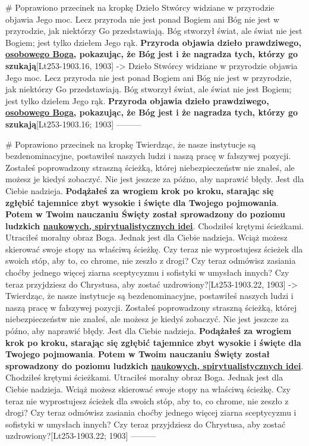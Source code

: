 # Poprawiono przecinek na kropkę
{Dzieło Stwórcy widziane w przyrodzie objawia Jego moc. Lecz przyroda nie jest ponad Bogiem ani Bóg nie jest w przyrodzie, jak niektórzy Go przedstawiają. Bóg stworzył świat, ale świat nie jest Bogiem; jest tylko dziełem Jego rąk. \textbf{Przyroda objawia dzieło prawdziwego, \underline{osobowego Boga}, pokazując, że Bóg jest i że nagradza tych, którzy go szukają}}[Lt253-1903.16, 1903]
->
{Dzieło Stwórcy widziane w przyrodzie objawia Jego moc. Lecz przyroda nie jest ponad Bogiem ani Bóg nie jest w przyrodzie, jak niektórzy Go przedstawiają. Bóg stworzył świat, ale świat nie jest Bogiem; jest tylko dziełem Jego rąk. \textbf{Przyroda objawia dzieło prawdziwego, \underline{osobowego Boga}, pokazując, że Bóg jest i że nagradza tych, którzy go szukają}}[Lt253-1903.16; 1903]
---------

# Poprawiono przecinek na kropkę
{Twierdząc, że nasze instytucje są bezdenominacyjne, postawiłeś naszych ludzi i naszą pracę w fałszywej pozycji. Zostałeś poprowadzony straszną ścieżką, której niebezpieczeństw nie znałeś, ale możesz je kiedyś zobaczyć. Nie jest jeszcze za późno, aby naprawić błędy. Jest dla Ciebie nadzieja. \textbf{Podążałeś za wrogiem krok po kroku, starając się zgłębić tajemnice zbyt wysokie i święte dla Twojego pojmowania}. \textbf{Potem w Twoim nauczaniu Święty został sprowadzony do poziomu ludzkich \underline{naukowych, spirytualistycznych idei}}. Chodziłeś krętymi ścieżkami. Utraciłeś moralny obraz Boga. Jednak jest dla Ciebie nadzieja. Wciąż możesz skierować swoje stopy na właściwą ścieżkę. Czy teraz nie wyprostujesz ścieżek dla swoich stóp, aby to, co chrome, nie zeszło z drogi? Czy teraz odmówisz zasiania choćby jednego więcej ziarna sceptycyzmu i sofistyki w umysłach innych? Czy teraz przyjdziesz do Chrystusa, aby zostać uzdrowiony?}[Lt253-1903.22, 1903]
->
{Twierdząc, że nasze instytucje są bezdenominacyjne, postawiłeś naszych ludzi i naszą pracę w fałszywej pozycji. Zostałeś poprowadzony straszną ścieżką, której niebezpieczeństw nie znałeś, ale możesz je kiedyś zobaczyć. Nie jest jeszcze za późno, aby naprawić błędy. Jest dla Ciebie nadzieja. \textbf{Podążałeś za wrogiem krok po kroku, starając się zgłębić tajemnice zbyt wysokie i święte dla Twojego pojmowania}. \textbf{Potem w Twoim nauczaniu Święty został sprowadzony do poziomu ludzkich \underline{naukowych, spirytualistycznych idei}}. Chodziłeś krętymi ścieżkami. Utraciłeś moralny obraz Boga. Jednak jest dla Ciebie nadzieja. Wciąż możesz skierować swoje stopy na właściwą ścieżkę. Czy teraz nie wyprostujesz ścieżek dla swoich stóp, aby to, co chrome, nie zeszło z drogi? Czy teraz odmówisz zasiania choćby jednego więcej ziarna sceptycyzmu i sofistyki w umysłach innych? Czy teraz przyjdziesz do Chrystusa, aby zostać uzdrowiony?}[Lt253-1903.22; 1903]
---------

